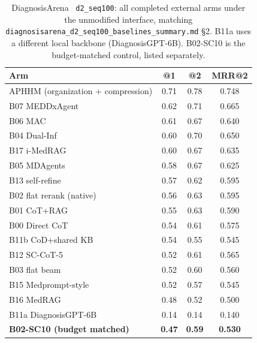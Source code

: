 \begin{table}[t]
\centering
\scriptsize
\caption{DiagnosisArena~\cite{diagnosisarena} \texttt{d2\_seq100}: all completed external arms under the unmodified interface, matching \texttt{diagnosisarena\_d2\_seq100\_baselines\_summary.md} §2. B11a uses a different local backbone (DiagnosisGPT-6B). B02-SC10 is the budget-matched control, listed separately.}
\label{tab:da-full}
\begin{tabular}{lccc}
\toprule
Arm & @1 & @2 & MRR@2 \\
\midrule
APHHM (organization + compression) & 0.71 & 0.78 & 0.748 \\
\midrule
B07 MEDDxAgent~\cite{meddxagent2025} & 0.62 & 0.71 & 0.665 \\
B06 MAC~\cite{chen2025mac,mac2026} & 0.61 & 0.67 & 0.640 \\
B04 Dual-Inf~\cite{dualinf2025} & 0.60 & 0.70 & 0.650 \\
B17 i-MedRAG~\cite{imedrag} & 0.60 & 0.67 & 0.635 \\
B05 MDAgents~\cite{mdagents} & 0.58 & 0.67 & 0.625 \\
B13 self-refine~\cite{madaan2023selfrefine} & 0.57 & 0.62 & 0.595 \\
B02 flat rerank (native) & 0.56 & 0.63 & 0.595 \\
B01 CoT+RAG & 0.55 & 0.63 & 0.590 \\
B00 Direct CoT & 0.54 & 0.61 & 0.575 \\
B11b CoD+shared KB~\cite{chainofdiagnosis} & 0.54 & 0.55 & 0.545 \\
B12 SC-CoT-5~\cite{wang2023selfconsistency} & 0.52 & 0.61 & 0.565 \\
B03 flat beam & 0.52 & 0.60 & 0.560 \\
B15 Medprompt-style~\cite{medprompt} & 0.52 & 0.57 & 0.545 \\
B16 MedRAG~\cite{medrag,xiong2024medrag} & 0.48 & 0.52 & 0.500 \\
B11a DiagnosisGPT-6B~\cite{chainofdiagnosis} & 0.14 & 0.14 & 0.140 \\
\midrule
\textbf{B02-SC10 (budget matched)} & \textbf{0.47} & \textbf{0.59} & \textbf{0.530} \\
\bottomrule
\end{tabular}
\end{table}

